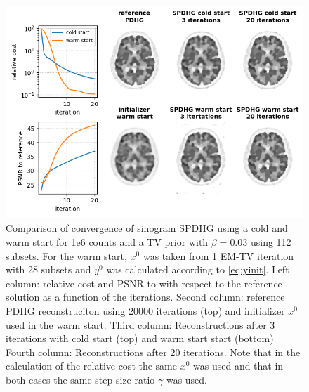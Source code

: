 \begin{figure}
  \centering
    \includegraphics[width=1.0\columnwidth]{figs/SPDHG_cold_vs_warm_start.png}
  \caption{Comparison of convergence of sinogram SPDHG using a cold and warm start
           for 1e6 counts and a TV prior with $\beta = 0.03$ using 112 subsets.
           For the warm start, $x^0$ was taken from 1 EM-TV iteration with 28 subsets
           and $y^0$ was calculated according to \eqref{eq:yinit}.
           Left column: relative cost and PSNR to with respect to the reference solution as
           a function of the iterations.
           Second column: reference PDHG reconstruciton using 20000 iterations (top) and
           initializer $x^0$ used in the warm start.
           Third column: Reconstructions after 3 iterations with cold start (top) and warm
           start start (bottom)
           Fourth column: Reconstructions after 20 iterations.
           Note that in the calculation of the relative cost the same $x^0$ was used
           and that in both cases the same step size ratio $\gamma$ was used.
          }
  \label{fig:warm_start}
\end{figure}


